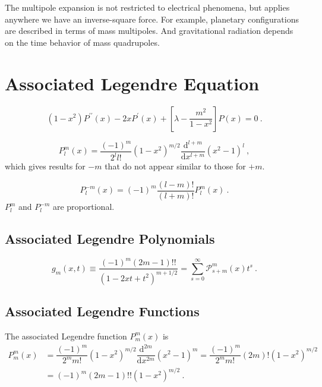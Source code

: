 \documentclass[12pt,a4paper]{article}
\newcommand{\dif}{\mathrm{d}}
\begin{document}
The multipole expansion is not restricted to electrical phenomena, but applies anywhere we have an inverse-square force. For example, planetary configurations are described in terms of mass multipoles. And gravitational radiation depends on the time behavior of mass quadrupoles.






\section{Associated Legendre Equation}
\cite{arfken} 
\begin{equation}
(1-x^2) P^{\prime \prime}(x) - 2x P^\prime(x) + \left[ \lambda - \dfrac{m^2}{1-x^2} \right] P(x) = 0 ~.
\end{equation}




\begin{equation}
P_l^m (x)  = \dfrac{(-1)^m}{2^l l!} (1-x^2)^{m/2} \dfrac{\dif^{l+m}}{\dif x^{l+m}} (x^2-1)^l ~,
\end{equation}
which gives results for $-m$ that do not appear similar to those for $+m$. 


\begin{equation}
P_l^{-m} (x) = (-1)^m \dfrac{(l-m)!}{(l+m)!} P_l^m (x) ~.
\end{equation}
$P_l^m$ and $P_l^{-m}$ are proportional.

\subsection{Associated Legendre Polynomials}
\begin{equation}
g_m(x,t) \equiv \dfrac{(-1)^m (2m-1)!!}{(1-2xt+t^2)^{m+1/2}} = \sum_{s=0}^\infty \mathcal P_{s+m}^m (x) t^s ~.
\end{equation}

\subsection{Associated Legendre Functions}

The associated Legendre function $P_m^m (x)$ is
\begin{align}
\nonumber P_m^m (x) &= \dfrac{(-1)^m}{2^m m!} (1-x^2)^{m/2} \dfrac{\dif^{2m}}{\dif x^{2m}} (x^2-1)^m = \dfrac{(-1)^m}{2^m m!} (2m)! (1-x^2)^{m/2} \\
\nonumber &= (-1)^m (2m-1)!! (1-x^2)^{m/2} ~.
\end{align}
\end{document}
